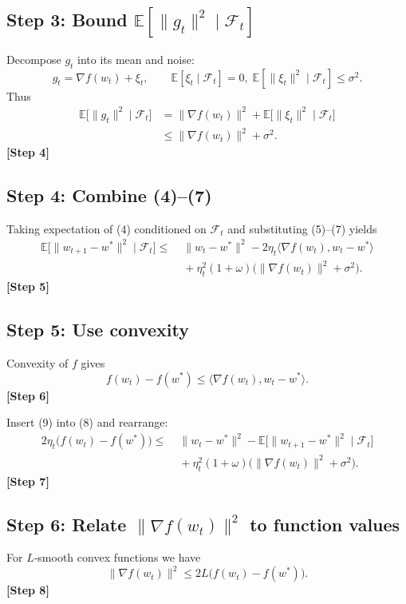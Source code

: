 \documentclass{article}
\newcommand{\E}{\mathbb{E}}
\begin{document}
\subsection*{Step 3: Bound $\E[\|g_{t}\|^{2}\mid\mathcal{F}_{t}]$}
Decompose $g_{t}$ into its mean and noise:
\[
g_{t}= \nabla f(w_{t}) + \xi_{t},\qquad \E[\xi_{t}\mid\mathcal{F}_{t}]=0,\;
\E[\|\xi_{t}\|^{2}\mid\mathcal{F}_{t}]\le\sigma^{2}.
\]
Thus
\[
\begin{aligned}
\E\!\bigl[\|g_{t}\|^{2}\mid\mathcal{F}_{t}\bigr]
&=\|\nabla f(w_{t})\|^{2}+ \E\!\bigl[\|\xi_{t}\|^{2}\mid\mathcal{F}_{t}\bigr] \\
&\le \|\nabla f(w_{t})\|^{2}+\sigma^{2}. \tag{7}
\end{aligned}
\]
\textbf{[Step 4]}

\subsection*{Step 4: Combine (4)–(7)}
Taking expectation of (4) conditioned on $\mathcal{F}_{t}$ and substituting (5)–(7) yields
\[
\begin{aligned}
\E\!\bigl[\|w_{t+1}-w^{*}\|^{2}\mid\mathcal{F}_{t}\bigr]
\le &\;\|w_{t}-w^{*}\|^{2}
      -2\eta_{t}\langle\nabla f(w_{t}),w_{t}-w^{*}\rangle \\
    &\;+\eta_{t}^{2}(1+\omega)\bigl(\|\nabla f(w_{t})\|^{2}+\sigma^{2}\bigr). \tag{8}
\end{aligned}
\]
\textbf{[Step 5]}

\subsection*{Step 5: Use convexity}
Convexity of $f$ gives
\[
f(w_{t})-f(w^{*})\le\langle\nabla f(w_{t}),w_{t}-w^{*}\rangle. \tag{9}
\]
\textbf{[Step 6]}

Insert (9) into (8) and rearrange:
\[
\begin{aligned}
2\eta_{t}\bigl(f(w_{t})-f(w^{*})\bigr)
\le &\;\|w_{t}-w^{*}\|^{2}-\E\!\bigl[\|w_{t+1}-w^{*}\|^{2}\mid\mathcal{F}_{t}\bigr] \\
   &\;+\eta_{t}^{2}(1+\omega)\bigl(\|\nabla f(w_{t})\|^{2}+\sigma^{2}\bigr). \tag{10}
\end{aligned}
\]
\textbf{[Step 7]}

\subsection*{Step 6: Relate $\|\nabla f(w_{t})\|^{2}$ to function values}
For $L$‑smooth convex functions we have
\[
\|\nabla f(w_{t})\|^{2}\le 2L\bigl(f(w_{t})-f(w^{*})\bigr). \tag{11}
\]
\textbf{[Step 8]}
\end{document}

